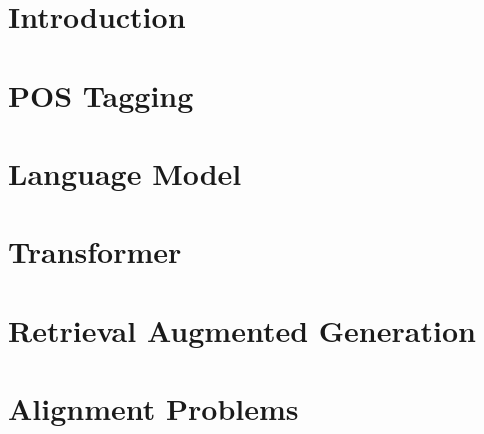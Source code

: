 \chapter{Introduction}



\chapter{POS Tagging}

\chapter{Language Model}


\chapter{Transformer}

\chapter{Retrieval Augmented Generation}

\chapter{Alignment Problems}

